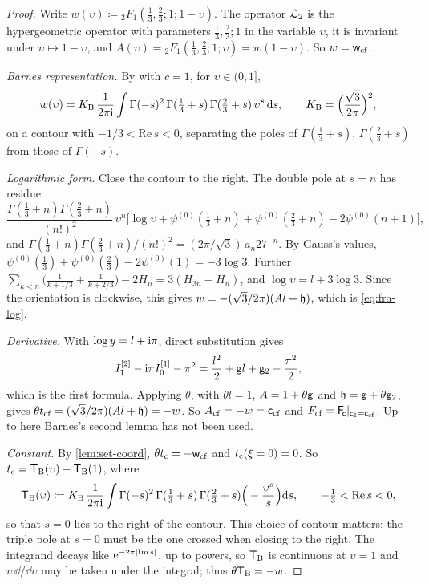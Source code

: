 \begin{proof}
Write $w(\upsilon)\coloneqq{}_2F_1(\tfrac13,\tfrac23;1;1-\upsilon)$. The operator $\mathcal{L}_{2}$ is the hypergeometric operator with parameters $\tfrac13,\tfrac23;1$ in the variable $\upsilon$, it is invariant under $\upsilon\mapsto1-\upsilon$, and $A(\upsilon)={}_2F_1(\tfrac13,\tfrac23;1;\upsilon)=w(1-\upsilon)$. So $w=\mathsf{w}_{\mathrm{cf}}$.

\emph{Barnes representation.} By \cite[Eq.~15.6.7]{DLMF} with $c=1$, for $\upsilon\in(0,1]$,
\[
w(\upsilon)=K_{\mathrm{B}}\,\frac{1}{2\pi\mathrm{i}}\int\Gamma(-s)^2\,\Gamma(\tfrac13+s)\,\Gamma(\tfrac23+s)\,\upsilon^s\,\mathrm{d} s,\qquad K_{\mathrm{B}}=\Big(\frac{\sqrt3}{2\pi}\Big)^2,
\]
on a contour with $-1/3<\mathrm{Re}\,s<0$, separating the poles of $\Gamma(\tfrac13+s)$, $\Gamma(\tfrac23+s)$ from those of $\Gamma(-s)$.

\emph{Logarithmic form.} Close the contour to the right. The double pole at $s=n$ has residue
\[
\frac{\Gamma(\tfrac13+n)\Gamma(\tfrac23+n)}{(n!)^2}\,\upsilon^n\big[\log\upsilon+\psi^{(0)}(\tfrac13+n)+\psi^{(0)}(\tfrac23+n)-2\psi^{(0)}(n+1)\big],
\]
and $\Gamma(\tfrac13+n)\Gamma(\tfrac23+n)/(n!)^2=(2\pi/\sqrt3)\,a_n27^{-n}$. By Gauss's values, $\psi^{(0)}(\tfrac13)+\psi^{(0)}(\tfrac23)-2\psi^{(0)}(1)=-3\log3$. Further $\sum_{k<n}\big(\frac{1}{k+1/3}+\frac{1}{k+2/3}\big)-2H_n=3(H_{3n}-H_n)$, and $\log\upsilon=l+3\log3$. Since the orientation is clockwise, this gives $w=-(\sqrt3/2\pi)(Al+\mathfrak{h})$, which is \eqref{eq:fra-log}.

\emph{Derivative.} With $\log y=l+\mathrm{i}\pi$, direct substitution gives
\[
I_1^{[2]}-\mathrm{i}\pi I_0^{[1]}-\pi^2=\frac{l^2}{2}+\mathsf{g} l+\mathsf{g}_{2}-\frac{\pi^2}{2},
\]
which is the first formula. Applying $\theta$, with $\theta l=1$, $A=1+\theta\mathsf{g}$ and $\mathfrak{h}=\mathsf{g}+\theta\mathsf{g}_{2}$, gives $\theta t_{\mathrm{cf}}=(\sqrt3/2\pi)(Al+\mathfrak{h})=-w$. So $A_{\mathrm{cf}}=-w=\mathsf{c}_{\mathrm{cf}}$ and $F_{\mathrm{cf}}=\mathsf{F}_{\!\mathsf{c}}|_{\mathsf{c}_{1}=\mathsf{c}_{\mathrm{cf}}}$. Up to here Barnes's second lemma has not been used.

\emph{Constant.} By \cref{lem:set-coord}, $\theta t_{\mathrm{c}}=-\mathsf{w}_{\mathrm{cf}}$ and $t_{\mathrm{c}}(\xi=0)=0$. So $t_{\mathrm{c}}=\mathsf{T}_{\mathrm{B}}(\upsilon)-\mathsf{T}_{\mathrm{B}}(1)$, where
\[
\mathsf{T}_{\mathrm{B}}(\upsilon)\coloneqq K_{\mathrm{B}}\,\frac{1}{2\pi\mathrm{i}}\int\Gamma(-s)^2\,\Gamma(\tfrac13+s)\,\Gamma(\tfrac23+s)\Big(-\frac{\upsilon^s}{s}\Big)\mathrm{d} s,\qquad-\tfrac13<\mathrm{Re}\,s<0,
\]
so that $s=0$ lies to the right of the contour. This choice of contour matters: the triple pole at $s=0$ must be the one crossed when closing to the right. The integrand decays like $\mathrm{e}^{-2\pi|\mathrm{Im}\,s|}$, up to powers, so $\mathsf{T}_{\mathrm{B}}$ is continuous at $\upsilon=1$ and $\upsilon\,\dd/\dd\upsilon$ may be taken under the integral; thus $\theta\mathsf{T}_{\mathrm{B}}=-w$.


\end{proof}
